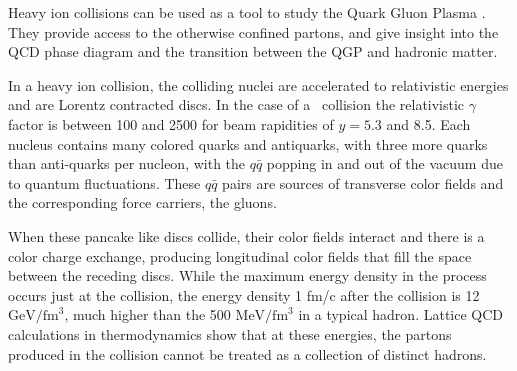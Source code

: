 Heavy ion collisions can be used as a tool to study the Quark Gluon Plasma \cite{SHURYAK198071} . They provide access to the otherwise confined partons, and give insight into the QCD phase diagram and the transition between the QGP and hadronic matter. 

In a heavy ion collision, the colliding nuclei are accelerated to relativistic energies and are Lorentz contracted discs. In the case of a \pbpb\ collision the relativistic $\gamma$ factor is between 100 and 2500 for beam rapidities of $y = 5.3$ and 8.5. Each nucleus contains many colored quarks and antiquarks, with three more quarks than anti-quarks per nucleon, with the $q\bar{q}$ popping in and out of the vacuum due to quantum fluctuations. These $q\bar{q}$ pairs are sources of transverse color fields and the corresponding force carriers, the gluons. 

When these pancake like discs collide, their color fields interact and there is a color charge exchange, producing longitudinal color fields that fill the space between the receding discs. While the maximum energy density in the process occurs just at the collision, the energy density 1 fm/c after the collision is 12 $\mathrm{GeV} / \mathrm{fm}^3$, much higher than the 500 $\mathrm{MeV} / \mathrm{fm}^3$ in a typical hadron. Lattice QCD calculations in thermodynamics show that at these energies, the partons produced in the collision cannot be treated as a collection of distinct hadrons. 



